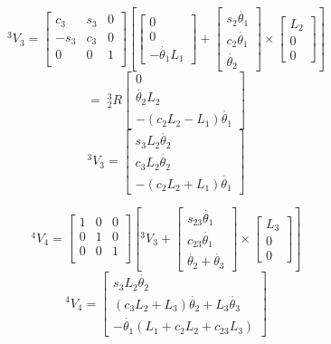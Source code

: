\begin{ExampleCont}
\[
^3V_3 =
\left [
\begin{array}{ccc}
c_3	& s_3	& 0		\\
-s_3	& c_3	& 0		\\
0	& 0	& 1		\\
\end{array}
\right ]
\left[
\left[
\begin{array}{c}
0  \\ 0 \\ -\dot{\theta_1}L_1
\end{array}
\right ]
+
\left[
\begin{array}{c}
s_2\dot{\theta_1}  \\ c_2\dot{\theta_1} \\ \dot{\theta_2}
\end{array}
\right ]
\times
\left[
\begin{array}{c}
L_2  \\ 0 \\ 0
\end{array}
\right ]
\right ]
\]
\[
= \; ^3_2R
\left[
\begin{array}{c}
0 \\ \dot{\theta_2}L_2     \\   -(c_2L_2-L_1)\dot{\theta_1}
\end{array}
\right ]
\]
\[
^3V_3 =
\left[
\begin{array}{c}
s_3L_2\dot{\theta_2}  \\ c_3L_2\dot{\theta_2} \\  -(c_2L_2+L_1)\dot{\theta_1}
\end{array}
\right ]
\]

\vspace{0.15in}

\[
^4V_4 =
\left [
\begin{array}{ccc}
1	& 0	& 0		\\
0	& 1	& 0		\\
0	& 0	& 1		\\
\end{array}
\right ]
\left[
^3V_3
+
\left[
\begin{array}{c}
s_{23}\dot{\theta_1} \\  c_{23}\dot{\theta_1} \\ \dot{\theta_2}+\dot{\theta_3}
\end{array}
\right ]
\times
\left[
\begin{array}{c}
L_3  \\ 0 \\ 0
\end{array}
\right ]
\right ]
\]
\[
^4V_4 =
\left[
\begin{array}{c}
s_3L_2\dot{\theta_2}   \\  (c_3L_2+L_3)\dot{\theta_2} + L_3\dot{\theta_3}  \\  -\dot{\theta_1}(L_1+c_2L_2+c_{23}L_3)
\end{array}
\right ]
\]

\end{ExampleCont}



